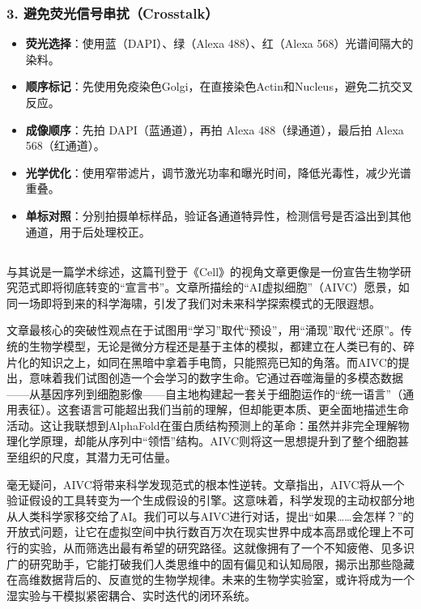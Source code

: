 \documentclass[10pt]{article}
\begin{document}
\subsubsection*{3. 避免荧光信号串扰（Crosstalk）}

\begin{itemize}

    \item \textbf{荧光选择}：使用蓝（DAPI）、绿（Alexa 488）、红（Alexa 568）光谱间隔大的染料。
    \item \textbf{顺序标记}：先使用免疫染色Golgi，在直接染色Actin和Nucleus，避免二抗交叉反应。
    \item \textbf{成像顺序}：先拍 DAPI（蓝通道），再拍 Alexa 488（绿通道），最后拍 Alexa 568（红通道）。
    \item \textbf{光学优化}：使用窄带滤片，调节激光功率和曝光时间，降低光毒性，减少光谱重叠。
    \item \textbf{单标对照}：分别拍摄单标样品，验证各通道特异性，检测信号是否溢出到其他通道，用于后处理校正。

\end{itemize}

\subsection{}

与其说是一篇学术综述，这篇刊登于《Cell》的视角文章更像是一份宣告生物学研究范式即将彻底转变的``宣言书''。文章所描绘的``AI虚拟细胞''（AIVC）愿景，如同一场即将到来的科学海啸，引发了我们对未来科学探索模式的无限遐想。

文章最核心的突破性观点在于试图用``学习''取代``预设''，用``涌现''取代``还原''。传统的生物学模型，无论是微分方程还是基于主体的模拟，都建立在人类已有的、碎片化的知识之上，如同在黑暗中拿着手电筒，只能照亮已知的角落。而AIVC的提出，意味着我们试图创造一个会学习的数字生命。它通过吞噬海量的多模态数据——从基因序列到细胞影像——自主地构建起一套关于细胞运作的``统一语言''（通用表征）。这套语言可能超出我们当前的理解，但却能更本质、更全面地描述生命活动。这让我联想到AlphaFold在蛋白质结构预测上的革命：虽然并非完全理解物理化学原理，却能从序列中``领悟''结构。AIVC则将这一思想提升到了整个细胞甚至组织的尺度，其潜力无可估量。

毫无疑问，AIVC将带来科学发现范式的根本性逆转。文章指出，AIVC将从一个验证假设的工具转变为一个生成假设的引擎。这意味着，科学发现的主动权部分地从人类科学家移交给了AI。我们可以与AIVC进行对话，提出``如果……会怎样？''的开放式问题，让它在虚拟空间中执行数百万次在现实世界中成本高昂或伦理上不可行的实验，从而筛选出最有希望的研究路径。这就像拥有了一个不知疲倦、见多识广的研究助手，它能打破我们人类思维中的固有偏见和认知局限，揭示出那些隐藏在高维数据背后的、反直觉的生物学规律。未来的生物学实验室，或许将成为一个湿实验与干模拟紧密耦合、实时迭代的闭环系统。
\end{document}
